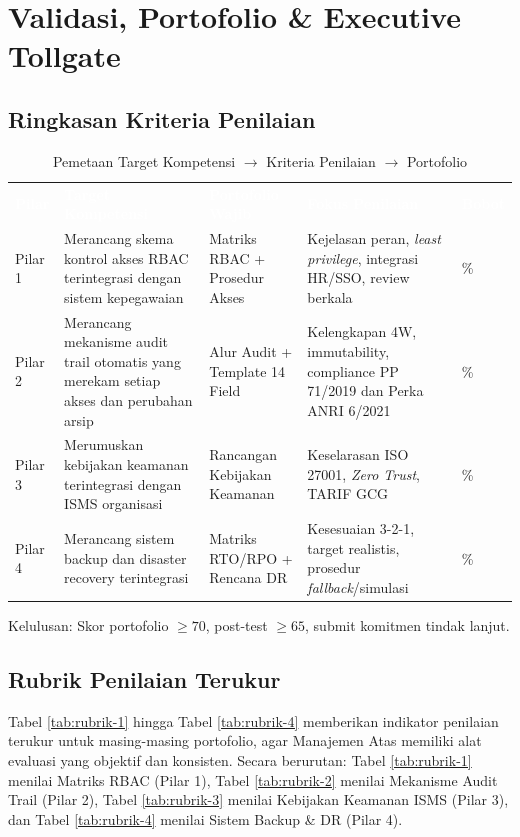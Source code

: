 \documentclass[12pt,a4paper]{report}
\begin{document}
\chapter{Validasi, Portofolio \& Executive Tollgate}

\section{Ringkasan Kriteria Penilaian}
\begin{table}[htbp]
\centering
\footnotesize
\caption{Pemetaan Target Kompetensi $\rightarrow$ Kriteria Penilaian $\rightarrow$ Portofolio}
\renewcommand{\arraystretch}{1.6}
\begin{tabularx}{\textwidth}{@{} >{\centering\arraybackslash}p{1cm} >{\raggedright\arraybackslash}p{3.5cm} X X >{\centering\arraybackslash}p{1cm} @{}}
\rowcolor{rowhead}
\textcolor{white}{\textbf{Pilar}} & \textcolor{white}{\textbf{Target Kompetensi}} & \textcolor{white}{\textbf{Portofolio Wajib}} & \textcolor{white}{\textbf{Fokus Penilaian}} & \textcolor{white}{\textbf{Bobot}} \\
\rowcolor{rowalt}
Pilar 1 & Merancang skema kontrol akses RBAC terintegrasi dengan sistem kepegawaian & Matriks RBAC + Prosedur Akses & Kejelasan peran, \textit{least privilege}, integrasi HR/SSO, review berkala & 25\% \\
\rowcolor{white}
Pilar 2 & Merancang mekanisme audit trail otomatis yang merekam setiap akses dan perubahan arsip & Alur Audit + Template 14 Field & Kelengkapan 4W, immutability, compliance PP 71/2019 dan Perka ANRI 6/2021 & 25\% \\
\rowcolor{rowalt}
Pilar 3 & Merumuskan kebijakan keamanan terintegrasi dengan ISMS organisasi & Rancangan Kebijakan Keamanan & Keselarasan ISO 27001, \textit{Zero Trust}, TARIF GCG & 25\% \\
\rowcolor{white}
Pilar 4 & Merancang sistem backup dan disaster recovery terintegrasi & Matriks RTO/RPO + Rencana DR & Kesesuaian 3-2-1, target realistis, prosedur \textit{fallback}/simulasi & 25\% \\
\bottomrule
\end{tabularx}
\end{table}
Kelulusan: Skor portofolio $\geq 70$, post-test $\geq 65$, submit komitmen tindak lanjut.

\section{Rubrik Penilaian Terukur}
Tabel \ref{tab:rubrik-1} hingga Tabel \ref{tab:rubrik-4} memberikan indikator penilaian terukur untuk masing-masing portofolio, agar Manajemen Atas memiliki alat evaluasi yang objektif dan konsisten. Secara berurutan: Tabel \ref{tab:rubrik-1} menilai Matriks RBAC (Pilar 1), Tabel \ref{tab:rubrik-2} menilai Mekanisme Audit Trail (Pilar 2), Tabel \ref{tab:rubrik-3} menilai Kebijakan Keamanan ISMS (Pilar 3), dan Tabel \ref{tab:rubrik-4} menilai Sistem Backup \& DR (Pilar 4).
\end{document}
